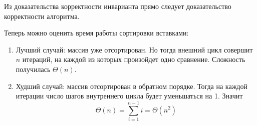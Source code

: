 \documentclass[../book.tex]{subfiles}
\begin{document}
	Из доказательства корректности инварианта прямо следует доказательство корректности алгоритма.
	
	Теперь можно оценить время работы сортировки вставками:
	\begin{enumerate}
		\item Лучший случай: массив уже отсортирован. Но тогда внешний цикл совершит $n$ итераций, на каждой из которых произойдет одно сравнение. Сложность получилась $\Theta(n)$.
		
		\item Худший случай: массив отсортирован в обратном порядке. Тогда на каждой итерации число шагов внутреннего цикла будет уменьшаться на 1. Значит 
		\[
		\Theta(n) = \sum_{i = 1}^{n - 1}i = \Theta(n^2)
		\]
	\end{enumerate}
	
	\pagebreak
\end{document}
